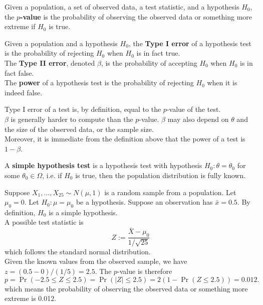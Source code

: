 \documentclass[11pt,fleqn]{book} %
\begin{document}
\begin{definition} \label{def:715}
Given a population, a set of observed data, a test statistic, and a hypothesis \(H_0\), the \textbf{\(p\)-value} is the probability of observing the observed data or something more extreme if \(H_0\) is true.
\end{definition}

\begin{definition} \label{def:716}
Given a population and a hypothesis \(H_0\), the \textbf{Type I error} of a hypothesis test is the probability of rejecting \(H_0\) when \(H_0\) is in fact true. \\
\indent The \textbf{Type II error}, denoted \(\beta\), is the probability of accepting \(H_0\) when \(H_0\) is in fact false. \\
\indent The \textbf{power} of a hypothesis test is the probability of rejecting \(H_0\) when it is indeed false.
\end{definition}

\begin{remark} \label{rmk:717}
Type I error of a test is, by definition, equal to the \(p\)-value of the test. \\
\indent \(\beta\) is generally harder to compute than the \(p\)-value. \(\beta\) may also depend on \(\theta\) and the size of the observed data, or the sample size. \\
\indent Moreover, it is immediate from the definition above that the power of a test is \(1 - \beta\).
\end{remark}

\begin{definition} \label{def:718}
A \textbf{simple hypothesis test} is a hypothesis test with hypothesis \(H_0:\theta = \theta_0\) for some \(\theta_0 \in \Omega\), i.e. if \(H_0\) is true, then the population distribution is fully known.
\end{definition}

\begin{example} \label{eg:719}
Suppose \(X_1, \ldots, X_{25} \sim N(\mu, 1)\) is a random sample from a population. Let \(\mu_0 = 0\). Let \(H_0:\mu = \mu_0\) be a hypothesis. Suppose an observation has \(\bar{x} = 0.5\). By definition, \(H_0\) is a simple hypothesis. \\
\indent A possible test statistic is
\[
Z := \frac{\bar{X} - \mu_0}{1 / \sqrt{25}}
\]
which follows the standard normal distribution. \\
\indent Given the known values from the observed sample, we have \(z = (0.5 - 0)/(1/5) = 2.5\). The \(p\)-value is therefore
\[
p = \Pr(-2.5 \leq Z \leq 2.5) = \Pr(|Z| \leq 2.5) = 2(1 - \Pr(Z \leq 2.5)) = 0.012.
\]
which means the probability of observing the observed data or something more extreme is 0.012.
\end{example}
\end{document}
